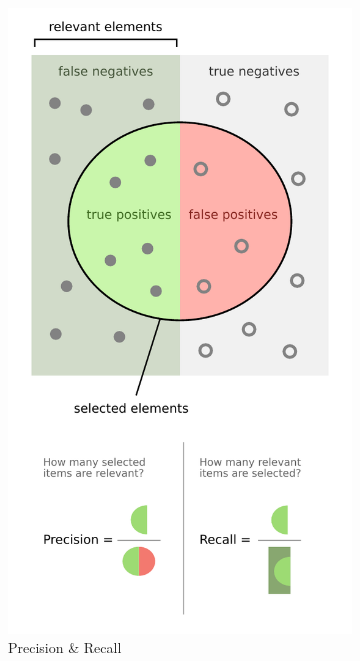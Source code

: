 \begin{figure}
\centering
  \begin{subfigure}[c]{0.48\textwidth}\centering
  \includegraphics[width=\textwidth]{figures/ml/precision_recall.pdf}
  \caption{Precision \& Recall}
  \label{fig:graphical_CM_quantities:precision_recall}
  \end{subfigure}
  ~
  \begin{subfigure}[c]{0.48\textwidth}\centering

\end{subfigure}
\end{figure}
